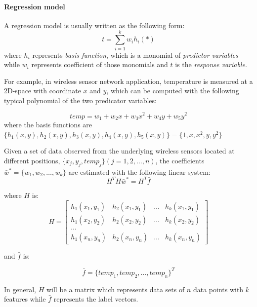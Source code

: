 \paragraph{Regression model}
A regression model is usually written as the following form:
\begin{equation}
t=\sum_{i=1}^kw_ih_i(*)
\end{equation}
where $h_i$ represents {\em basis function}, which is a monomial of {\em predictor variables} while $w_i$ represents coefficient of those monomials and $t$ is the {\em response variable}.

For example, in wireless sensor network application, temperature is measured at a 2D-space with coordinate $x$ and $y$, which can be computed with the following typical polynomial of the two predicator variables:

\begin{equation}
temp=w_1 + w_2x+w_3x^2 + w_4y+w_5y^2
\end{equation}
where the basis functions are $\{h_1(x,y), h_2(x,y), h_3(x,y),h_4(x,y), h_5(x,y)\}=\{1, x, x^2, y, y^2\}$

Given a set of data observed from the underlying wireless sensors located at different positions, $\{x_j,y_j,temp_j\}(j=1,2,\dots,n)$, the coefficients $\bar{w}^* = \{w_1,w_2,\dots,w_k\}$ are estimated with the following linear system:
\begin{equation}\label{eq: regression_solve}
    H^TH\bar{w}^*=H^T\bar{f}
\end{equation}

where $H$ is:
\begin{equation}
    H=\begin{bmatrix}
h_1(x_1,y_1) & h_2(x_1,y_1) &\dots &h_k(x_1,y_1)\\
h_1(x_2,y_2) & h_2(x_2,y_2) &\dots &h_k(x_2,y_2)\\
\dots\\
h_1(x_n,y_n) & h_2(x_n,y_n) &\dots &h_k(x_n,y_n)
\end{bmatrix}
\end{equation}

and $\bar{f}$ is:

\begin{equation}
    \bar{f} = \{temp_1, temp_2,\dots, temp_n\}^T
\end{equation}

In general, $H$ will be a matrix which represents data sets of $n$ data points with $k$ features while $\bar{f}$ represents the label vectors.

